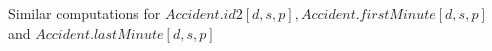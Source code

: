 Similar computations for $Accident.id2[d,s,p], Accident.firstMinute[d,s,p]$ and $Accident.lastMinute[d,s,p]$
\begin{comment}
\begin{eqnarray*}
\algnew_{+I} Accident.id2[d, s, p] &=& \algincr_{max} \algmax_{ID2} (\algincrdiff_{\cup} 
\pi_{\vec{i}} \;\sigma_{\dots}(  \{\tuple{} \} \times I2 \times I11 \times I22) \cup 
\pi_{\vec{i2}} \;\sigma_{\dots}(I \times \{\tuple{} \} \times I11 \times I22) \cup \\
&&\pi_{\vec{i11}} \;\sigma_{\dots}(I \times  I2 \times  \{\tuple{} \} \times I22) \cup 
\pi_{\vec{i22}} \;\sigma_{ \dots}(I \times I2 \times I11 \times \{\tuple{} \} ) )\\
%
\algnew_{+I}Accident.firstMinute[d, s, p] &=&  (\algincr_{min} \algmin_{TIME} (\algincrdiff_{\cup} 
\pi_{\vec{i}} \;\sigma_{\dots}(  \{\tuple{} \} \times I2 \times I11 \times I22) \cup 
\pi_{\vec{i2}} \;\sigma_{\dots}(I \times \{\tuple{} \} \times I11 \times I22) \cup \\
&&\pi_{\vec{i11}} \;\sigma_{\dots}(I \times  I2 \times  \{\tuple{} \} \times I22) \cup 
\pi_{\vec{i22}} \;\sigma_{ \dots}(I \times I2 \times I11 \times \{\tuple{} \} ) ) +90 )/60 +1\\
%
\algnew_{+I}Accident.lastMinute[d, s, p] &=& (\algincr_{max} \algmax_{TIME} (\algincrdiff_{\cup} 
\pi_{\vec{i}} \;\sigma_{\dots}(  \{\tuple{} \} \times I2 \times I11 \times I22) \cup 
\pi_{\vec{i2}} \;\sigma_{\dots}(I \times \{\tuple{} \} \times I11 \times I22) \cup \\
&&\pi_{\vec{i11}} \;\sigma_{\dots}(I \times  I2 \times  \{\tuple{} \} \times I22) \cup 
\pi_{\vec{i22}} \;\sigma_{ \dots}(I \times I2 \times I11 \times \{\tuple{} \} ) ) +120 )/60 +1\\
\end{eqnarray*}
\end{comment}
\pagebreak

